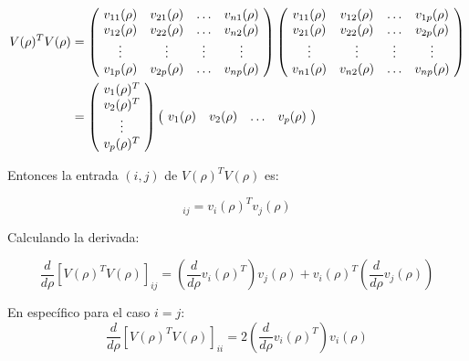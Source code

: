 \begin{equation*}
\begin{aligned}
V(\rho)^T V(\rho)  &= \left(\!
    \begin{array}{cccc}
      v_{11}(\rho) & v_{21}(\rho) & \hdots & v_{n1}(\rho) \\
      v_{12}(\rho) & v_{22}(\rho) & \hdots & v_{n2}(\rho) \\
      \vdots & \vdots & \vdots & \vdots \\
      v_{1p}(\rho) & v_{2p}(\rho) & \hdots & v_{np}(\rho) 
    \end{array}
  \!\right)
    \left(\!
    \begin{array}{cccc}
      v_{11}(\rho) & v_{12}(\rho) & \hdots & v_{1p}(\rho) \\
      v_{21}(\rho) & v_{22}(\rho) & \hdots & v_{2p}(\rho) \\
      \vdots & \vdots & \vdots & \vdots \\
      v_{n1}(\rho) & v_{n2}(\rho) & \hdots & v_{np}(\rho) 
    \end{array} 
    \!\right) \\
    \vspace{5mm}
 &= \left(\!
    \begin{array}{c}
      v_{1}(\rho)^T \\
      v_{2}(\rho)^T \\
      \vdots \\
      v_{p}(\rho)^T  
    \end{array}
  \!\right)
  \left(\!
    \begin{array}{cccc}
      v_{1}(\rho) & v_{2}(\rho) & \hdots & v_{p}(\rho) 
    \end{array} 
	\!\right) 
\end{aligned}
\end{equation*}

Entonces la entrada $(i,j)$ de $V(\rho)^T V(\rho)$ es:

\begin{equation*}
	[V(\rho)^T V(\rho)]_{ij} = v_i(\rho)^T v_j(\rho)
\end{equation*}

Calculando la derivada:

\begin{equation*}
\frac{d}{d\rho}[V(\rho)^T V(\rho)]_{ij} =  \left( \frac{d}{d\rho}v_i(\rho)^T \right)  v_j(\rho) + v_i(\rho)^T \left( \frac{d}{d\rho} v_j(\rho)\right) 
\end{equation*}

En específico para el caso $i = j$:
\vspace{5mm}
\begin{equation}\label{eq:3.7}
\frac{d}{d\rho}[V(\rho)^T V(\rho)]_{ii} =  2 \left( \frac{d}{d\rho}v_i(\rho)^T \right)  v_i(\rho)
\end{equation}

